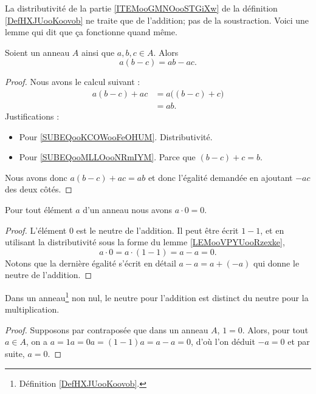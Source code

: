 La distributivité de la partie \ref{ITEMooGMNOooSTGiXw} de la définition \ref{DefHXJUooKoovob} ne traite que de l'addition; pas de la soustraction. Voici une lemme qui dit que ça fonctionne quand même.
\begin{lemma}     \label{LEMooVPYUooRzexke}
    Soient un anneau \( A\) ainsi que \( a,b,c\in A\). Alors
    \begin{equation}
        a(b-c)=ab-ac.
    \end{equation}
\end{lemma}

\begin{proof}
    Nous avons le calcul suivant :
    \begin{subequations}
        \begin{align}
            a(b-c)+ac&=a\big( (b-c)+c \big)     \label{SUBEQooKCOWooFeOHUM}\\
            &=ab.       \label{SUBEQooMLLOooNRmIYM}
        \end{align}
    \end{subequations}
    Justifications :
    \begin{itemize}
        \item Pour \ref{SUBEQooKCOWooFeOHUM}. Distributivité.
        \item Pour \ref{SUBEQooMLLOooNRmIYM}. Parce que \( (b-c)+c=b\).
    \end{itemize}
    Nous avons donc \( a(b-c)+ac=ab\) et donc l'égalité demandée en ajoutant \( -ac\) des deux côtés.
\end{proof}

\begin{lemma}       \label{LEMooVUSMooWisQpD}
    Pour tout élément \( a\) d'un anneau nous avons \( a\cdot 0=0\).
\end{lemma}

\begin{proof}
    L'élément \( 0\) est le neutre de l'addition. Il peut être écrit \( 1-1\), et en utilisant la distributivité sous la forme du lemme \ref{LEMooVPYUooRzexke},
    \begin{equation}
        a\cdot 0=a\cdot (1-1)=a-a=0.
    \end{equation}
    Notons que la dernière égalité s'écrit en détail \( a-a=a+(-a)\) qui donne le neutre de l'addition.
\end{proof}

\begin{proposition}     \label{PROPooNCCGooXjVyVt}
    Dans un anneau\footnote{Définition \ref{DefHXJUooKoovob}.} non nul, le neutre pour l'addition est distinct du neutre pour la multiplication.
\end{proposition}
\begin{proof}
    Supposons par contraposée que dans un anneau $A$, \( 1 = 0 \). Alors, pour tout \( a \in A \), on a \( a = 1a = 0a = (1 - 1)a = a - a=0 \), d'où l'on déduit \( -a = 0  \) et par suite, \( a = 0. \)
\end{proof}

